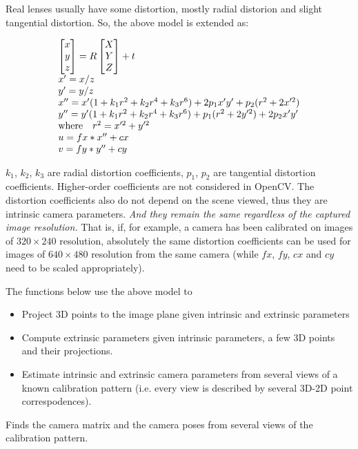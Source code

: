 \begin{description}
Real lenses usually have some distortion, mostly
radial distorion and slight tangential distortion. So, the above model
is extended as:

\[
\begin{array}{l}
\begin{bmatrix} x\\ y\\ z \end{bmatrix} = R \begin{bmatrix} X\\ Y\\ Z \end{bmatrix} + t\\
x' = x/z\\
y' = y/z\\
x'' = x' (1 + k_1 r^2 + k_2 r^4 + k_3 r^6) + 2 p_1 x' y' + p_2(r^2 + 2 x'^2) \\
y'' = y' (1 + k_1 r^2 + k_2 r^4 + k_3 r^6) + p_1 (r^2 + 2 y'^2) + 2 p_2 x' y' \\
\text{where} \quad r^2 = x'^2 + y'^2 \\
u = fx*x'' + cx\\
v = fy*y'' + cy
\end{array}
\]

$k_1$, $k_2$, $k_3$ are radial distortion coefficients, $p_1$, $p_2$ are tangential distortion coefficients.
Higher-order coefficients are not considered in OpenCV.
The distortion coefficients also do not depend on the scene viewed, thus they are intrinsic camera parameters.
\emph{And they remain the same regardless of the captured image resolution.}
That is, if, for example, a camera has been calibrated on images of $320
\times 240$ resolution, absolutely the same distortion coefficients can
be used for images of $640 \times 480$ resolution from the same camera (while $fx$,
$fy$, $cx$ and $cy$ need to be scaled appropriately).

The functions below use the above model to

\begin{itemize}
 \item Project 3D points to the image plane given intrinsic and extrinsic parameters
 \item Compute extrinsic parameters given intrinsic parameters, a few 3D points and their projections.
 \item Estimate intrinsic and extrinsic camera parameters from several views of a known calibration pattern (i.e. every view is described by several 3D-2D point correspodences).
\end{itemize}


\label{calibrateCamera}
Finds the camera matrix and the camera poses from several views of the calibration pattern.


\end{description}
